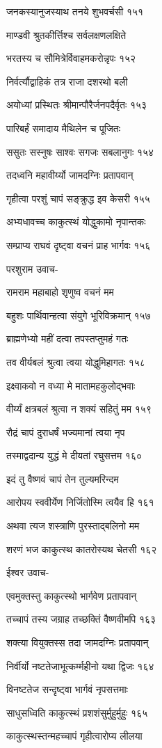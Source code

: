 जनकस्यानुजस्याथ तनये शुभवर्चसी १५१

माण्डवी श्रुतकीर्त्तिश्च सर्वलक्षणलक्षिते

भरतस्य च सौमित्रेर्विवाहमकरोन्नृपः १५२

निर्वर्त्यौद्वाहिकं तत्र राजा दशरथो बली

अयोध्यां प्रस्थितः श्रीमान्पौरैर्जनपदैर्वृतः १५३

पारिबर्हं समादाय मैथिलेन च पूजितः

ससुतः सस्नुषः साश्वः सगजः सबलानुगः १५४

तदध्वनि महावीर्य्यो जामदग्निः प्रतापवान्

गृहीत्वा परशुं चापं सङ्क्रुद्ध इव केसरी १५५

अभ्यधावच्च काकुत्स्थं योद्धुकामो नृपान्तकः

सम्प्राप्य राघवं दृष्ट्वा वचनं प्राह भार्गवः १५६

परशुराम उवाच-

रामराम महाबाहो शृणुष्व वचनं मम

बहुशः पार्थिवान्हत्वा संयुगे भूरिविक्रमान् १५७

ब्राह्मणेभ्यो महीं दत्वा तपस्तप्तुमहं गतः

तव वीर्यबलं श्रुत्वा त्वया योद्धुमिहागतः १५८

इक्ष्वाकवो न वध्या मे मातामहकुलोद्भवाः

वीर्य्यं क्षत्रबलं श्रुत्वा न शक्यं सहितुं मम १५९

रौद्रं चापं दुराधर्षं भज्यमानां त्वया नृप

तस्माद्वदान्य युद्धं मे दीयतां रघुसत्तम १६०

इदं तु वैष्णवं चापं तेन तुल्यमरिन्दम

आरोपय स्ववीर्येण निर्जितोस्मि त्वयैव हि १६१

अथवा त्यज शस्त्राणि पुरस्ताद्बलिनो मम

शरणं भज काकुत्स्थ कातरोस्यथ चेतसी १६२

ईश्वर उवाच-

एवमुक्तस्तु काकुत्स्थो भार्गवेण प्रतापवान्

तच्चापं तस्य जग्राह तच्छक्तिं वैष्णवीमपि १६३

शक्त्या वियुक्तस्स तदा जामदग्निः प्रतापवान्

निर्वीर्यो नष्टतेजाभूत्कर्म्महीनो यथा द्विजः १६४

विनष्टतेज सन्दृष्ट्वा भार्गवं नृपसत्तमाः

साधुसध्विति काकुत्स्थं प्रशशंसुर्मुहुर्मुहुः १६५

काकुत्स्थस्तन्महच्चापं गृहीत्वारोप्य लीलया

